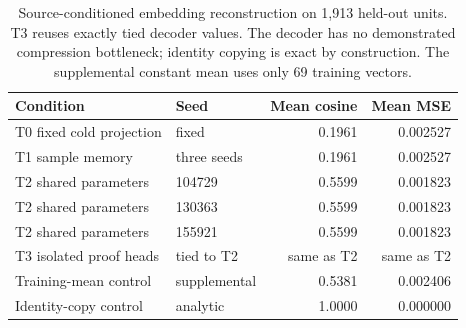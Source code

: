 \begin{table}[t]
\centering\small
\caption{Source-conditioned embedding reconstruction on 1,913 held-out units. T3 reuses exactly tied decoder values. The decoder has no demonstrated compression bottleneck; identity copying is exact by construction. The supplemental constant mean uses only 69 training vectors.}
\label{tab:training-results}
\begin{tabular}{llrr}\toprule
Condition & Seed & Mean cosine & Mean MSE\\\midrule
T0 fixed cold projection & fixed & 0.1961 & 0.002527\\
T1 sample memory & three seeds & 0.1961 & 0.002527\\
T2 shared parameters & 104729 & 0.5599 & 0.001823\\
T2 shared parameters & 130363 & 0.5599 & 0.001823\\
T2 shared parameters & 155921 & 0.5599 & 0.001823\\
T3 isolated proof heads & tied to T2 & same as T2 & same as T2\\
Training-mean control & supplemental & 0.5381 & 0.002406\\
Identity-copy control & analytic & 1.0000 & 0.000000\\
\bottomrule
\end{tabular}
\end{table}
